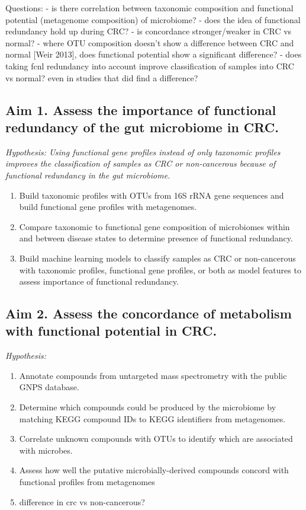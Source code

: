 \documentclass[12pt]{article}
\begin{document}
Questions:
- is there correlation between taxonomic composition and functional potential (metagenome composition) of microbiome?
- does the idea of functional redundancy hold up during CRC?
- is concordance stronger/weaker in CRC vs normal?
- where OTU composition doesn't show a difference between CRC and normal [Weir 2013], does functional potential show a significant difference?
- does taking fcnl redundancy into account improve classification of samples into CRC vs normal? even in studies that did find a difference?

\subsection*{Aim 1. Assess the importance of functional redundancy of the gut microbiome in CRC.}
\textit{Hypothesis: Using functional gene profiles instead of only taxonomic profiles improves the classification of samples as CRC or non-cancerous because of functional redundancy in the gut microbiome.}
\begin{enumerate}
    \item Build taxonomic profiles with OTUs from 16S rRNA gene sequences and build functional gene profiles with metagenomes.
    \item Compare taxonomic to functional gene composition of microbiomes within and between disease states to determine presence of functional redundancy.
    \item Build machine learning models to classify samples as CRC or non-cancerous with taxonomic profiles, functional gene profiles, or both as model features to assess importance of functional redundancy.
\end{enumerate}

\subsection*{Aim 2. Assess the concordance of metabolism with functional potential in CRC.}
\textit{Hypothesis: }
\begin{enumerate}
    \item Annotate compounds from untargeted mass spectrometry with the public GNPS database.
    \item Determine which compounds could be produced by the microbiome by matching KEGG compound IDs to KEGG identifiers from metagenomes.
    \item Correlate unknown compounds with OTUs to identify which are associated with microbes.
    \item Assess how well the putative microbially-derived compounds concord with functional profiles from metagenomes
    \item difference in crc vs non-cancerous?
\end{enumerate}
\end{document}
